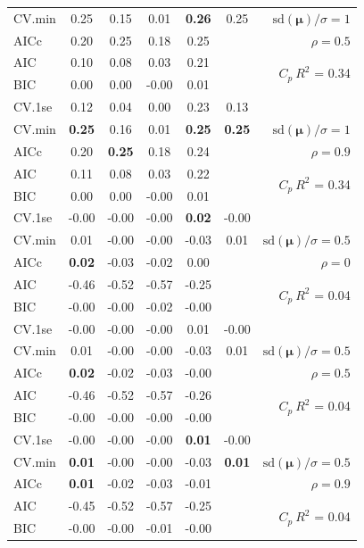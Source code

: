 \documentclass[12pt]{article}
\newcommand{\mr}[1]{\mathrm{#1}}
\newcommand{\bm}[1]{\mathbf{#1}}
\begin{document}
\begin{table}[p]
\begin{center}
\begin{tabular}{l*{5}{c}|r}
CV.min & 0.25 & 0.15 & 0.01 & {\bf 0.26} & 0.25 &  $\mr{sd}(\bm{\mu})/\sigma=1$ \\
AICc & 0.20 & 0.25 & 0.18 & 0.25 & & $\rho=0.5$ \\
AIC & 0.10 & 0.08 & 0.03 & 0.21 & & \multirow{2}{*}{$C_p ~ R^2$ = 0.34} \\
BIC & 0.00 & 0.00 & -0.00 & 0.01 & & \\
 \hline 
CV.1se & 0.12 & 0.04 & 0.00 & 0.23 & 0.13 &\\
CV.min & {\bf 0.25} & 0.16 & 0.01 & {\bf 0.25} & {\bf 0.25} &  $\mr{sd}(\bm{\mu})/\sigma=1$ \\
AICc & 0.20 & {\bf 0.25} & 0.18 & 0.24 & & $\rho=0.9$ \\
AIC & 0.11 & 0.08 & 0.03 & 0.22 & & \multirow{2}{*}{$C_p ~ R^2$ = 0.34} \\
BIC & 0.00 & 0.00 & -0.00 & 0.01 & & \\
 \hline 
CV.1se & -0.00 & -0.00 & -0.00 & {\bf 0.02} & -0.00 &\\
CV.min & 0.01 & -0.00 & -0.00 & -0.03 & 0.01 &  $\mr{sd}(\bm{\mu})/\sigma=0.5$ \\
AICc & {\bf 0.02} & -0.03 & -0.02 & 0.00 & & $\rho=0$ \\
AIC & -0.46 & -0.52 & -0.57 & -0.25 & & \multirow{2}{*}{$C_p ~ R^2$ = 0.04} \\
BIC & -0.00 & -0.00 & -0.02 & -0.00 & & \\
 \hline 
CV.1se & -0.00 & -0.00 & -0.00 & 0.01 & -0.00 &\\
CV.min & 0.01 & -0.00 & -0.00 & -0.03 & 0.01 &  $\mr{sd}(\bm{\mu})/\sigma=0.5$ \\
AICc & {\bf 0.02} & -0.02 & -0.03 & -0.00 & & $\rho=0.5$ \\
AIC & -0.46 & -0.52 & -0.57 & -0.26 & & \multirow{2}{*}{$C_p ~ R^2$ = 0.04} \\
BIC & -0.00 & -0.00 & -0.00 & -0.00 & & \\
 \hline 
CV.1se & -0.00 & -0.00 & -0.00 & {\bf 0.01} & -0.00 &\\
CV.min & {\bf 0.01} & -0.00 & -0.00 & -0.03 & {\bf 0.01} &  $\mr{sd}(\bm{\mu})/\sigma=0.5$ \\
AICc & {\bf 0.01} & -0.02 & -0.03 & -0.01 & & $\rho=0.9$ \\
AIC & -0.45 & -0.52 & -0.57 & -0.25 & & \multirow{2}{*}{$C_p ~ R^2$ = 0.04} \\
BIC & -0.00 & -0.00 & -0.01 & -0.00 & & \\
 \hline 
\end{tabular}
\end{center}
\vspace{-1cm}
\end{table}
\end{document}
